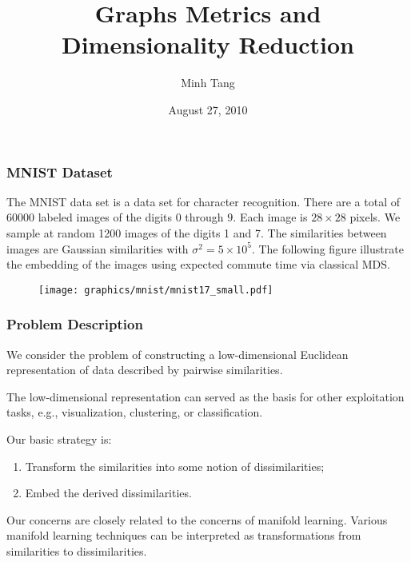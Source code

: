 \documentclass[professionalfonts, hyperref={pdfpagelabels=false,
  colorlinks=true, linkcolor=purple}]{beamer}
\begin{document}
\title[Graphs Metrics and Dimensionality Reduction]{Graphs Metrics and
  Dimensionality Reduction}
\author[Tang]{Minh Tang}

\date{August 27, 2010}

\begin{frame}
\titlepage
\end{frame}

\begin{frame}
  \frametitle{MNIST Dataset}
  The MNIST data set \cite{lecun98:_gradien} is a data set for
  character recognition. There are a total of $60000$ labeled images of
  the digits $0$ through $9$. Each image is $28 \times 28$ pixels. We
  sample at random 1200 images of the digits 1 and 7. The
  similarities between images are Gaussian similarities with
  $\sigma^2 = 5 \times 10^5$. The following figure illustrate the
  embedding of the images using expected commute time via
  classical MDS.
  \begin{figure}
    \centering
    \texttt{[image: graphics/mnist/mnist17\_small.pdf]}
   \label{fig:mnist17_example} 
  \end{figure}
\end{frame}

\begin{frame}
  \frametitle{Problem Description}
  We consider the problem of constructing a low-dimensional Euclidean
  representation of data described by pairwise similarities. 
  
 \vskip10pt The low-dimensional representation can served as the basis
 for other exploitation tasks, e.g., visualization, clustering, or 
 classification.  
 
 \vskip10pt Our basic strategy is:

  \begin{enumerate}
  \item Transform the similarities into some notion of dissimilarities;
  \item Embed the derived dissimilarities.
  \end{enumerate}
  
  Our concerns are closely related to the concerns of \alert{manifold
    learning}. Various manifold learning techniques can be interpreted
  as transformations from similarities to dissimilarities.
\end{frame}
\end{document}
